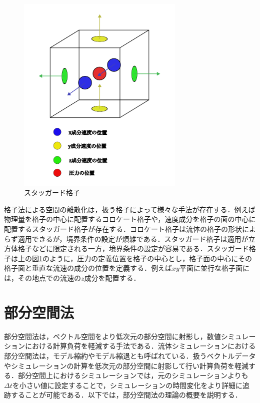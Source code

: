 \documentclass[a4j,12pt]{jreport}
\begin{document}
\begin{figure}[H]
\begin{center}
\includegraphics[width=80mm]{images/3dstaggerd.png}
\caption{スタッガード格子}
\label{fig:staggerd}
\end{center}
\end{figure}
格子法による空間の離散化は，扱う格子によって様々な手法が存在する．例えば物理量を格子の中心に配置するコロケート格子や，速度成分を格子の面の中心に配置するスタッガード格子が存在する．コロケート格子は流体の格子の形状によらず適用できるが，境界条件の設定が煩雑である．スタッガード格子は適用が立方体格子などに限定される一方，境界条件の設定が容易である．スタッガード格子は上の図\ref{fig:staggerd}のように，圧力の定義位置を格子の中心とし，格子面の中心にその格子面と垂直な流速の成分の位置を定義する．例えば$xy$平面に並行な格子面には，その地点での流速の$z$成分を配置する．

\section{部分空間法}\label{sec:Subspace}
部分空間法は，ベクトル空間をより低次元の部分空間に射影し，数値シミュレーションにおける計算負荷を軽減する手法である．流体シミュレーションにおける部分空間法は，モデル縮約やモデル縮退とも呼ばれている．扱うベクトルデータやシミュレーションの計算を低次元の部分空間に射影して行い計算負荷を軽減する．部分空間上におけるシミュレーションでは，元のシミュレーションよりも$\varDelta t$を小さい値に設定することで，シミュレーションの時間変化をより詳細に追跡することが可能である．以下では，部分空間法の理論の概要を説明する．
\end{document}
